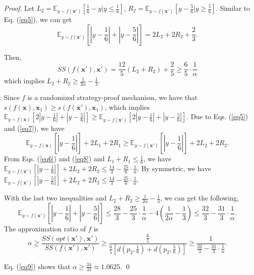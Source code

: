 \documentclass[runningheads]{11llncst}
\begin{document}
\begin{proof}
Let $L_2=\mathbb{E}_{y\sim f(\textbf{x}')}[\frac{1}{6}-y|y\leq \frac{1}{6}]$, $R_2=\mathbb{E}_{y\sim f(\textbf{x}')}[y-\frac{5}{6}|y\geq\frac{5}{6}]$. Similar to Eq. (\ref{eq5}), we can get 
\begin{equation}\label{eq7}
     \mathbb{E}_{y\sim f(\textbf{x}')}\left[\left|y-\frac{1}{6}\right|+\left|y-\frac{5}{6}\right|\right]=2L_2+2R_2+\frac{2}{3}.
\end{equation}

Then, $$SS(f(\textbf{x}'),\textbf{x}')=\frac{12}{5}(L_2+R_2)+\frac{2}{5}\geq\frac{6}{5}\cdot\frac{1}{\alpha}$$ which implies  $L_2+R_2\geq\frac{1}{2\alpha}-\frac{1}{3}$. 

Since $f$ is a randomized strategy-proof mechanism, we have that  $s(f(\textbf{x}),\textbf{x}_1)\geq s(f(\textbf{x}'),\textbf{x}_1)$, which implies $\mathbb{E}_{y\sim f(\textbf{x})}[2|y-\frac{1}{6}|+|y-\frac{5}{6}|]\geq\mathbb{E}_{y\sim f(\textbf{x}')}[2|y-\frac{1}{6}|+|y-\frac{5}{6}|]$.
	Due to Eqs. (\ref{eq5}) and (\ref{eq7}), we have 
	\begin{equation}\label{eq8}
		\mathbb{E}_{y\sim f(\textbf{x})}\left[\left|y-\frac{1}{6}\right|\right]+2L_1+2R_1\geq \mathbb{E}_{y\sim f(\textbf{x}')}\left[\left|y-\frac{1}{6}\right|\right]+2L_2+2R_2.
	\end{equation}
From Eqs. (\ref{eq6}) and (\ref{eq8}) and $L_1+R_1\leq \frac{1}{6}$, we have 
$\mathbb{E}_{y\sim f(\textbf{x}')}\left[|y-\frac{1}{6}|\right]+2L_2+2R_2\leq \frac{14}{3}-\frac{25}{6}\cdot\frac{1}{\alpha}$.  By symmetric, we have $\mathbb{E}_{y\sim f(\textbf{x}')}\left[|y-\frac{5}{6}|\right]+2L_2+2R_2\leq \frac{14}{3}-\frac{25}{6}\cdot\frac{1}{\alpha}$. 


	
	With the last two inequalities and  $L_2+R_2\geq\frac{1}{2\alpha}-\frac{1}{3}$,  we can get the following, $$\mathbb{E}_{y\sim f(\textbf{x}')}\left[\left|y-\frac{1}{6}\right|+\left|y-\frac{5}{6}\right|\right]\leq\frac{28}{3}-\frac{25}{3}\cdot\frac{1}{\alpha}-4\left(\frac{1}{2\alpha}-\frac{1}{3}\right)\leq \frac{32}{3}-\frac{31}{3}\cdot\frac{1}{\alpha}.$$
	The approximation ratio of $f$ is 
	\begin{equation} \label{eq9}
		\alpha\geq\frac{SS(opt(\textbf{x}'),\textbf{x}')}{SS(f(\textbf{x}'),\textbf{x}')}\geq \frac{\frac{6}{5}}{\frac{6}{5}\left[d(p_2,\frac{1}{6})+d(p_2,\frac{5}{6})\right]}\geq\frac{1}{\frac{32}{3}-\frac{31}{3}\cdot\frac{1}{\alpha}}.   
	\end{equation}
	
	Eq. (\ref{eq9}) shows that $\alpha\geq\frac{34}{32}\approx1.0625$. \qed

\end{proof}
\end{document}
